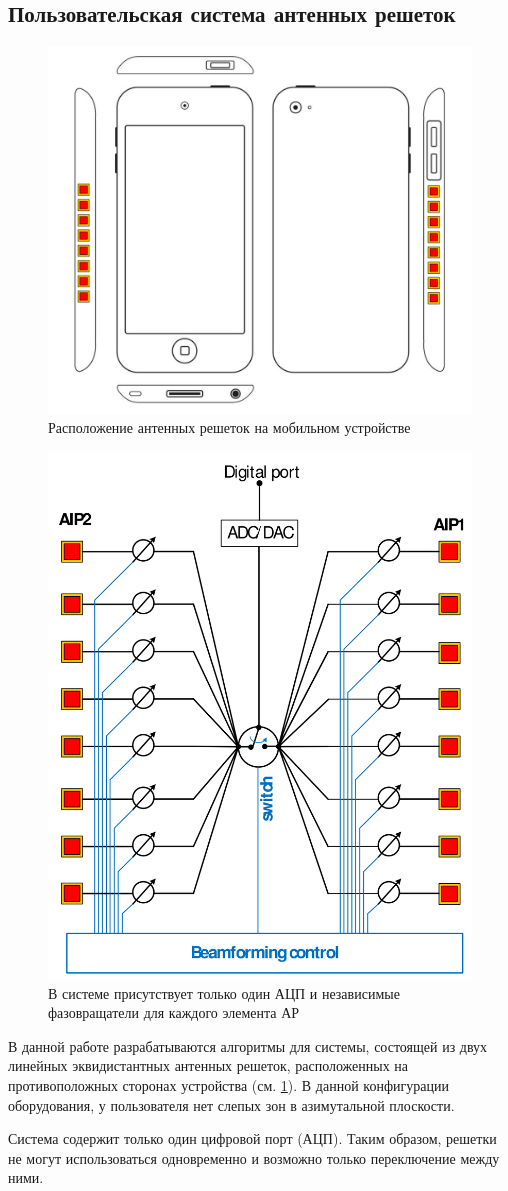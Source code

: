 \subsection{Пользовательская система антенных решеток}
\begin{figure}[ht]
    \centering
    \includegraphics[width=0.5\linewidth]{figs/fig4.3}
    \caption{Расположение антенных решеток на мобильном устройстве}
    \label{fig:4.3}
\end{figure}

\begin{figure}[ht]
    \centering
    \includegraphics[width=0.4\linewidth]{figs/fig4.4}
    \caption{В системе присутствует только один АЦП и независимые фазовращатели для каждого элемента АР}
    \label{fig:4.4}
\end{figure}

В данной работе разрабатываются алгоритмы для системы, состоящей из двух линейных эквидистантных антенных решеток, расположенных на противоположных сторонах
устройства (см. \ref{fig:4.3}). В данной конфигурации оборудования, у пользователя нет слепых зон в азимутальной плоскости.

Система содержит только один цифровой порт (АЦП). Таким образом, решетки не могут
использоваться одновременно и возможно только переключение между ними.

